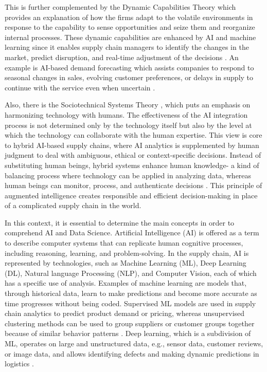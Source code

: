 This is further complemented by the Dynamic Capabilities Theory \autocite{teece_explicating_2007} which provides an explanation of how the firms adapt to the volatile environments in response to the capability to sense opportunities and seize them and reorganize internal processes. These dynamic capabilities are enhanced by AI and machine learning since it enables supply chain managers to identify the changes in the market, predict disruption, and real-time adjustment of the decisions \autocite{tothz2025}. An example is AI-based demand forecasting which assists companies to respond to seasonal changes in sales, evolving customer preferences, or delays in supply to continue with the service even when uncertain \autocite{ahn2024generativeprobabilisticplanningoptimizing, kumar2024ai}.

Also, there is the Sociotechnical Systems Theory \autocite{bostrom1977}, which puts an emphasis on harmonizing technology with humans. The effectiveness of the AI integration process is not determined only by the technology itself but also by the level at which the technology can collaborate with the human expertise. This view is core to hybrid AI-based supply chains, where AI analytics is supplemented by human judgment to deal with ambiguous, ethical or context-specific decisions. Instead of substituting human beings, hybrid systems enhance human knowledge- a kind of balancing process where technology can be applied in analyzing data, whereas human beings can monitor, process, and authenticate decisions \autocite{vann2025human}. This principle of augmented intelligence creates responsible and efficient decision-making in place of a complicated supply chain in the world.

In this context, it is essential to determine the main concepts in order to comprehend AI and Data Science. Artificial Intelligence (AI) is offered as a term to describe computer systems that can replicate human cognitive processes, including reasoning, learning, and problem-solving. In the supply chain, AI is represented by technologies, such as Machine Learning (ML), Deep Learning (DL), Natural language Processing (NLP), and Computer Vision, each of which has a specific use of analysis. Examples of machine learning are models that, through historical data, learn to make predictions and become more accurate as time progresses without being coded. Supervised ML models are used in supply chain analytics to predict product demand or pricing, whereas unsupervised clustering methods can be used to group suppliers or customer groups together because of similar behavior patterns \autocite{KHEDR2024100379}. Deep learning, which is a subdivision of ML, operates on large and unstructured data, e.g., sensor data, customer reviews, or image data, and allows identifying defects and making dynamic predictions in logistics \autocite{hosseinnia2023applications, riesen2025sociotechnological}.

